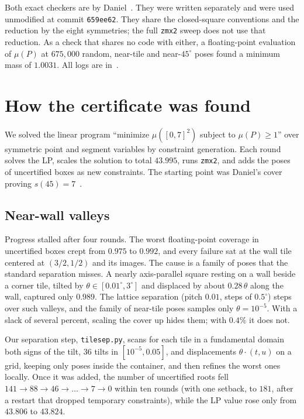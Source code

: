 \documentclass[11pt]{amsart}
\theoremstyle{remark}
\begin{document}
\medskip
Both exact checkers are by Daniel~\cite{daniel}. They were written separately and were used unmodified at commit
\texttt{659ee62}. They share the closed-square conventions and the reduction by the eight symmetries; the full
\texttt{zmx2} sweep does not use that reduction. As a check that shares no code with either, a floating-point
evaluation of $\mu(P)$ at $675{,}000$ random, near-tile and near-$45^\circ$ poses found a minimum mass of $1.0031$.
All logs are in~\cite{repo}.

\section{How the certificate was found}

We solved the linear program ``minimize $\mu([0,7]^2)$ subject to $\mu(P)\ge1$'' over symmetric point and segment
variables by constraint generation. Each round solves the LP, scales the solution to total $43.995$, runs
\texttt{zmx2}, and adds the poses of uncertified boxes as new constraints. The starting point was Daniel's cover
proving $s(45)=7$~\cite{daniel}.

\subsection*{Near-wall valleys}
Progress stalled after four rounds. The worst floating-point coverage in uncertified boxes crept from $0.975$ to
$0.992$, and every failure sat at the wall tile centered at $(3/2,1/2)$ and its images. The cause is a family of
poses that the standard separation misses. A nearly axis-parallel square resting on a wall beside a corner tile,
tilted by $\theta\in[0.01^\circ,3^\circ]$ and displaced by about $0.28\,\theta$ along the wall, captured only
$0.989$. The lattice separation (pitch $0.01$, steps of $0.5^\circ$) steps over such valleys, and the family of
near-tile poses samples only $\theta=10^{-5}$. With a slack of several percent, scaling the cover up hides them;
with $0.4\%$ it does not.

Our separation step, \texttt{tilesep.py}, scans for each tile in a fundamental domain both signs of the tilt,
$36$ tilts in $[10^{-5},0.05]$, and displacements $\theta\cdot(t,u)$ on a grid, keeping only poses inside the
container, and then refines the worst ones locally. Once it was added, the number of uncertified roots fell
$141\to88\to46\to\dots\to7\to0$ within ten rounds (with one setback, to $181$, after a restart that dropped
temporary constraints), while the LP value rose only from $43.806$ to $43.824$.
\end{document}
